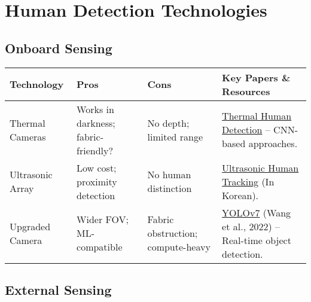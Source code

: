 \section*{Human Detection Technologies}
\subsection*{Onboard Sensing}

\begin{table}[H]
    \centering
    \begin{tabular}{|>{\raggedright\arraybackslash}p{3cm}|>{\raggedright\arraybackslash}p{3cm}|>{\raggedright\arraybackslash}p{3cm}|>{\raggedright\arraybackslash}p{5cm}|}
        \hline
        \textbf{Technology} & \textbf{Pros} & \textbf{Cons} & \textbf{Key Papers \& Resources} \\ \hline
        Thermal Cameras & Works in darkness; fabric-friendly? & No depth; limited range & \href{https://www.researchgate.net/publication/330762720_Real-Time_Implementation_of_Human_Detection_in_Thermal_Imagery_Based_on_CNN}{Thermal Human Detection}  – CNN-based approaches. \\ \hline
        Ultrasonic Array & Low cost; proximity detection & No human distinction & \href{https://koreascience.kr/article/JAKO202019962560668.pdf}{Ultrasonic Human Tracking} (In Korean). \\ \hline
        Upgraded Camera & Wider FOV; ML-compatible & Fabric obstruction; compute-heavy & \href{https://arxiv.org/abs/2207.02696}{YOLOv7} (Wang et al., 2022) – Real-time object detection. \\ \hline
    \end{tabular}
\end{table}

\subsection*{External Sensing}

